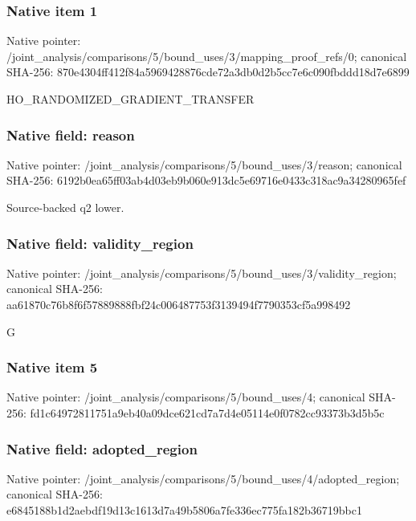 \documentclass[10pt,a4paper]{article}
\begin{document}
\subsubsection{Native item 1}
Native pointer: /joint\_\allowbreak{}analysis/comparisons/5/bound\_\allowbreak{}uses/3/mapping\_\allowbreak{}proof\_\allowbreak{}refs/0; canonical SHA-256: 870e4304ff412f84a5969428876cde72a3db0d2b5cc7e6c090fbddd18d7e6899

\begingroup\raggedright\sloppy HO\_\allowbreak{}RANDOMIZED\_\allowbreak{}GRADIENT\_\allowbreak{}TRANSFER\par\endgroup

\subsubsection{Native field: reason}
Native pointer: /joint\_\allowbreak{}analysis/comparisons/5/bound\_\allowbreak{}uses/3/reason; canonical SHA-256: 6192b0ea65ff03ab4d03eb9b060e913dc5e69716e0433c318ac9a34280965fef

\begingroup\raggedright\sloppy Source-backed q2 lower.\par\endgroup

\subsubsection{Native field: validity\_\allowbreak{}region}
Native pointer: /joint\_\allowbreak{}analysis/comparisons/5/bound\_\allowbreak{}uses/3/validity\_\allowbreak{}region; canonical SHA-256: aa61870c76b8f6f57889888fbf24c006487753f3139494f7790353cf5a998492

\begingroup\raggedright\sloppy G\par\endgroup

\subsubsection{Native item 5}
Native pointer: /joint\_\allowbreak{}analysis/comparisons/5/bound\_\allowbreak{}uses/4; canonical SHA-256: fd1c64972811751a9eb40a09dce621cd7a7d4e05114e0f0782cc93373b3d5b5c

\subsubsection{Native field: adopted\_\allowbreak{}region}
Native pointer: /joint\_\allowbreak{}analysis/comparisons/5/bound\_\allowbreak{}uses/4/adopted\_\allowbreak{}region; canonical SHA-256: e6845188b1d2aebdf19d13c1613d7a49b5806a7fe336ec775fa182b36719bbc1
\end{document}
